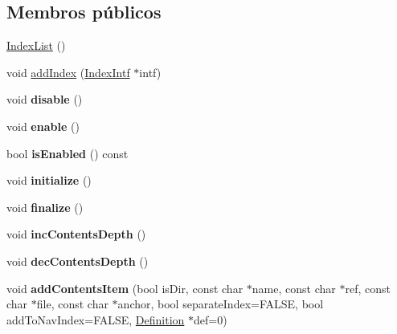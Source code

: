 \subsection*{Membros públicos}
\begin{DoxyCompactItemize}
\item 
\hyperlink{class_index_list_a07a99092edd15c653e57afb84f5ba33e}{Index\-List} ()
\item 
void \hyperlink{class_index_list_aaef2ed6fcf52afb255b6c6752805a5ab}{add\-Index} (\hyperlink{class_index_intf}{Index\-Intf} $\ast$intf)
\item 
\hypertarget{class_index_list_a8cfbbe53c1cf6e3054736daea3044c0f}{void {\bfseries disable} ()}\label{class_index_list_a8cfbbe53c1cf6e3054736daea3044c0f}

\item 
\hypertarget{class_index_list_a486f22824bd83c5308a0d70ffac6f758}{void {\bfseries enable} ()}\label{class_index_list_a486f22824bd83c5308a0d70ffac6f758}

\item 
\hypertarget{class_index_list_ae2931e09e0fd8eac15c83f0254b4e4ac}{bool {\bfseries is\-Enabled} () const }\label{class_index_list_ae2931e09e0fd8eac15c83f0254b4e4ac}

\item 
\hypertarget{class_index_list_a25a40b6614565f755233080a384c35f1}{void {\bfseries initialize} ()}\label{class_index_list_a25a40b6614565f755233080a384c35f1}

\item 
\hypertarget{class_index_list_a32d626626eee0bc4ade146973f6abb1c}{void {\bfseries finalize} ()}\label{class_index_list_a32d626626eee0bc4ade146973f6abb1c}

\item 
\hypertarget{class_index_list_a96772b5eeae8044b3308f63fb040c253}{void {\bfseries inc\-Contents\-Depth} ()}\label{class_index_list_a96772b5eeae8044b3308f63fb040c253}

\item 
\hypertarget{class_index_list_a3a6a2629dd91105d0048f0d0a9f7f983}{void {\bfseries dec\-Contents\-Depth} ()}\label{class_index_list_a3a6a2629dd91105d0048f0d0a9f7f983}

\item 
\hypertarget{class_index_list_aa49d319f9fb9c90b564389911af4aac3}{void {\bfseries add\-Contents\-Item} (bool is\-Dir, const char $\ast$name, const char $\ast$ref, const char $\ast$file, const char $\ast$anchor, bool separate\-Index=F\-A\-L\-S\-E, bool add\-To\-Nav\-Index=F\-A\-L\-S\-E, \hyperlink{class_definition}{Definition} $\ast$def=0)}\label{class_index_list_aa49d319f9fb9c90b564389911af4aac3}


\end{DoxyCompactItemize}
